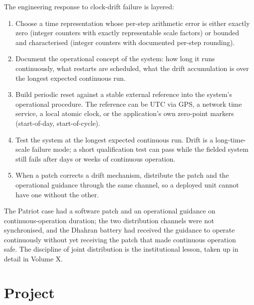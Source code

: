 The engineering response to clock-drift failure is layered:

\begin{enumerate}[leftmargin=*]
  \item Choose a time representation whose per-step arithmetic
    error is either exactly zero (integer counters with exactly
    representable scale factors) or bounded and characterised
    (integer counters with documented per-step rounding).
  \item Document the operational concept of the system: how long
    it runs continuously, what restarts are scheduled, what the
    drift accumulation is over the longest expected continuous
    run.
  \item Build periodic reset against a stable external reference
    into the system's operational procedure. The reference can be
    UTC via GPS, a network time service, a local atomic clock, or
    the application's own zero-point markers (start-of-day,
    start-of-cycle).
  \item Test the system at the longest expected continuous run.
    Drift is a long-time-scale failure mode; a short qualification
    test can pass while the fielded system still fails after days
    or weeks of continuous operation.
  \item When a patch corrects a drift mechanism, distribute the
    patch and the operational guidance through the same channel,
    so a deployed unit cannot have one without the other.
\end{enumerate}

The Patriot case had a software patch and an operational guidance
on continuous-operation duration; the two distribution channels
were not synchronised, and the Dhahran battery had received the
guidance to operate continuously without yet receiving the patch
that made continuous operation safe. The discipline of joint
distribution is the institutional lesson, taken up in detail in
Volume X.

\section{Project}

